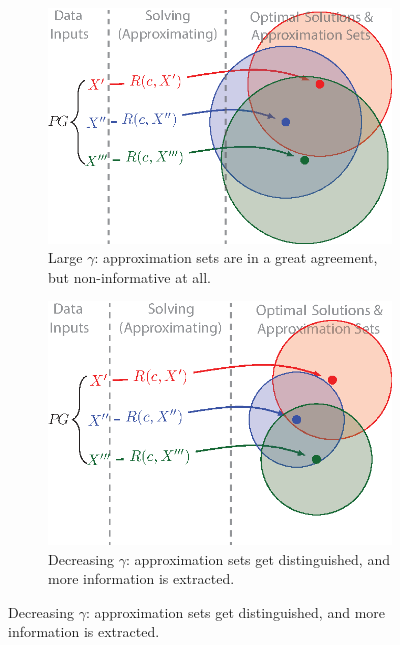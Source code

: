 \begin{figure}[th!]
        \centering
        \begin{subfigure}[b]{.48\textwidth}
            \includegraphics[width=\linewidth]{figures/ch_generic_approach/asc_coding_approximation_1}
            \caption{Large $\gamma$: approximation sets are in a great agreement, but non-informative at all.\\}
            \label{fig:asc_illustration-0}
        \end{subfigure}
        \hfill
        \begin{subfigure}[b]{.48\textwidth}
            \includegraphics[width=\linewidth]{figures/ch_generic_approach/asc_coding_approximation_2}
            \caption{Decreasing $\gamma$: approximation sets get distinguished, and more information is extracted.}
            \label{fig:asc_illustration-1}

\end{subfigure}
\end{figure}

